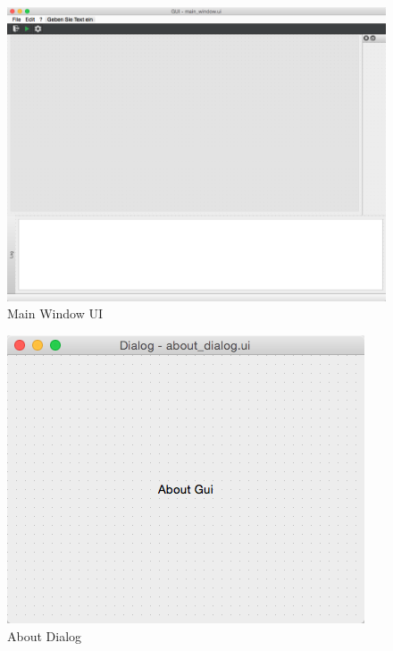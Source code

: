 \documentclass[a4paper]{scrreprt}
\begin{document}
\begin{figure}[hbt]
  \centering
  \includegraphics[scale=0.4]{images/main_window_ui}
  \caption{Main Window UI}
  \label{img:main-win}
\end{figure}

\begin{figure}[hbt]
  \centering
  \includegraphics[scale=0.5]{images/about_dialog_ui}
  \caption{About Dialog}
  \label{img:about-diag}
\end{figure}
\end{document}
